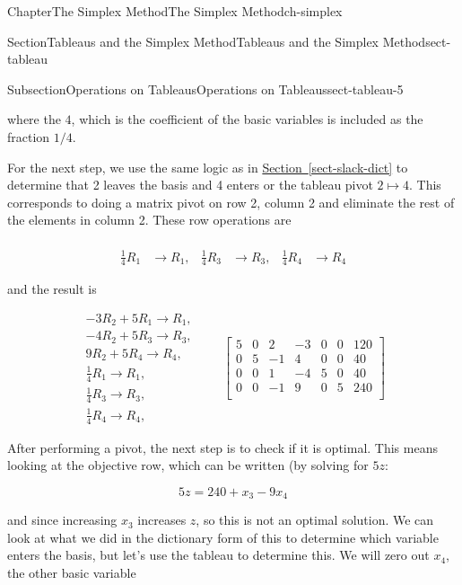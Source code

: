\documentclass[oneside,10pt,]{book}
\newcommand{\xreffont}{\relax}
\numberwithin{equation}{section}
\newcommand{\amp}{&}
\begin{document}
\begin{chapterptx}{Chapter}{The Simplex Method}{}{The Simplex Method}{}{}{ch-simplex}
\begin{sectionptx}{Section}{Tableaus and the Simplex Method}{}{Tableaus and the Simplex Method}{}{}{sect-tableau}
\begin{subsectionptx}{Subsection}{Operations on Tableaus}{}{Operations on Tableaus}{}{}{sect-tableau-5}
\begin{equation*}
\end{equation*}
%
\par
where the \(4\), which is the coefficient of the basic variables is included as the fraction \(1/4\).%
\par
For the next step, we use the same logic as in \hyperref[sect-slack-dict]{Section~{\xreffont\ref{sect-slack-dict}}} to determine that 2 leaves the basis and 4 enters or the tableau pivot \(2 \mapsto 4\). This corresponds to doing a matrix pivot on row 2, column 2 and eliminate the rest of the elements in column 2. These row operations are%
\par
%
\begin{align*}
\\
\frac{1}{4} R_1 \amp \to R_1, \amp \frac{1}{4} R_3 \amp\to R_3, \amp \frac{1}{4} R_4 \amp \to R_4
\end{align*}
%
\par
and the result is%
\par
%
\begin{equation}
\begin{array}{r} -3R_{2} +5R_{1}\to R_{1}, \\ -4R_{2} +5R_{3} \to R_{3},\\ 9R_{2} + 5 R_{4} \to R_{4}, \\ \frac{1}{4} R_1 \to R_1, \\ \frac{1}{4} R_3 \to R_3, \\ \frac{1}{4} R_4 \to R_4, \end{array} \qquad \left[\begin{array}{rr|rrrr|r} 5 \amp 0 \amp 2 \amp -3 \amp 0 \amp 0 \amp 120\\ 0 \amp 5 \amp -1 \amp 4 \amp 0 \amp 0 \amp 40\\ 0 \amp 0 \amp 1 \amp -4 \amp 5 \amp 0 \amp 40\\ \hline 0 \amp 0 \amp -1 \amp 9 \amp 0 \amp 5 \amp 240\\ \end{array} \right]\label{eq-tableau-LOP1-step3}
\end{equation}
%
\par
After performing a pivot, the next step is to check if it is optimal. This means looking at the objective row, which can be written (by solving for \(5z\):%
\par
%
\begin{equation*}
5z = 240 + x_3 - 9x_4
\end{equation*}
%
\par
and since increasing \(x_3\) increases \(z\), so this is not an optimal solution. We can look at what we did in the dictionary form of this to determine which variable enters the basis, but let's use the tableau to determine this. We will zero out \(x_4\), the other basic variable%

\end{subsectionptx}
\end{sectionptx}
\end{chapterptx}
\end{document}
